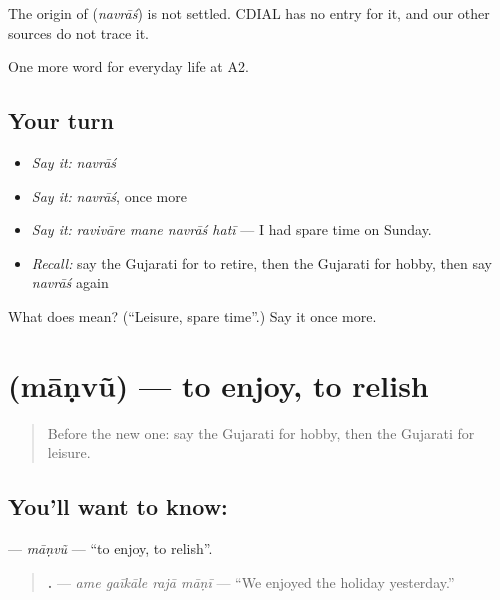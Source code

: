 \begin{cousinweb}
The origin of \textbf{} (\emph{navrāś}) is not settled. CDIAL has no entry for it, and our other sources do not trace it.
\end{cousinweb}

\begin{grammarlens}[title={What you've built}]
One more word for everyday life at A2.
\end{grammarlens}

\subsection*{Your turn}
\begin{itemize}
\raggedright
  \item \emph{Say it:} \emph{navrāś}
  \item \emph{Say it:} \emph{navrāś}, once more
  \item \emph{Say it:} \emph{ravivāre mane navrāś hatī} — I had spare time on Sunday.
  \item \emph{Recall:} say the Gujarati for to retire, then the Gujarati for hobby, then say \emph{navrāś} again
\end{itemize}

\begin{tcolorbox}[breakable,colback=teal!4,colframe=teal!35!black,title={Before you move on}]
What does  mean? (\textquotedblleft{}Leisure, spare time\textquotedblright{}.) Say it once more.
\end{tcolorbox}
\section[\texorpdfstring{\gu{માણવું} (māṇvũ)}{માણવું (māṇvũ)}]{ (māṇvũ) — to enjoy, to relish}

\label{lesson:GU-C253-manvu-enjoy}



\begin{quote}
Before the new one: say the Gujarati for hobby, then the Gujarati for leisure.
\end{quote}

\subsection*{You'll want to know: }
\textbf{} — \emph{māṇvũ} — \textquotedblleft{}to enjoy, to relish\textquotedblright{}.

\begin{quote}
\textbf{   .} — \emph{ame gaīkāle rajā māṇī} — \textquotedblleft{}We enjoyed the holiday yesterday.\textquotedblright{}
\end{quote}

